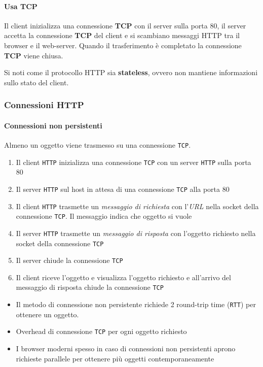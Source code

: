        \paragraph{Usa TCP} Il client inizializza una connessione \textbf{TCP} con il server sulla porta 80, il server accetta la connessione \textbf{TCP} del client e si scambiano messaggi HTTP tra il browser e il web-server. Quando il trasferimento è completato la connessione \textbf{TCP} viene chiusa.
        
        Si noti come il protocollo HTTP sia \textbf{stateless}, ovvero non mantiene informazioni sullo stato del client.

        \subsubsection{Connessioni HTTP}
            \paragraph{Connessioni non persistenti} Almeno un oggetto viene trasmesso su una connessione \texttt{TCP}.
                \begin{enumerate}
                    \item Il client \texttt{HTTP} inizializza una connessione \texttt{TCP} con un server \texttt{HTTP} sulla porta 80
                    \item Il server \texttt{HTTP} sul host in attesa di una connessione \texttt{TCP} alla porta 80
                    \item Il client \texttt{HTTP} trasmette un \textit{messaggio di richiesta} con l'\textit{URL} nella socket della connessione \texttt{TCP}. Il messaggio indica che oggetto si vuole
                    \item Il server \texttt{HTTP} trasmette un \textit{messaggio di risposta} con l'oggetto richiesto nella socket della connessione \texttt{TCP}
                    \item Il server chiude la connessione \texttt{TCP}
                    \item Il client riceve l'oggetto e visualizza l'oggetto richiesto e all'arrivo del messaggio di risposta chiude la connessione \texttt{TCP}
                \end{enumerate}
                \begin{itemize}
                    \item Il metodo di connessione non persistente richiede 2 round-trip time (\texttt{RTT}) per ottenere un oggetto.
                    \item Overhead di connessione \texttt{TCP} per ogni oggetto richiesto
                    \item I browser moderni spesso in caso di connessioni non persistenti aprono richieste parallele per ottenere più oggetti contemporaneamente
                \end{itemize}
